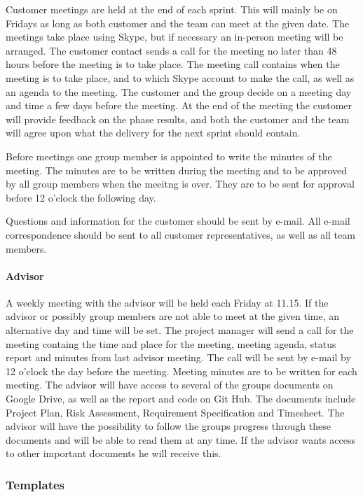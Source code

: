 Customer meetings are held at the end of each sprint. This will mainly be on Fridays as long as both customer and the team can meet at the given date. The meetings take place using Skype, but if necessary an in-person meeting will be arranged. The customer contact sends a call for the meeting no later than 48 hours before the meeting is to take place. The meeting call contains when the meeting is to take place, and to which Skype account to make the call, as well as an agenda to the meeting. The customer and the group decide on a meeting day and time a few days before the meeting. At the end of the meeting the customer will provide feedback on the phase results, and both the customer and the team will agree upon what the delivery for the next sprint should contain.

Before meetings one group member is appointed to write the minutes of the meeting. The minutes are to be written during the meeting and to be approved by all group members when the meeitng is over. They are to be sent for approval before 12 o'clock the following day. 

Questions and information for the customer should be sent by e-mail. All e-mail correspondence should be sent to all customer representatives, as well as all team members.

\paragraph{Advisor}

A weekly meeting with the advisor will be held each Friday at 11.15. If the advisor or possibly group members are not able to meet at the given time, an alternative day and time will be set. The project manager will send a call for the meeting containg the time and place for the meeting, meeting agenda, status report and minutes from last advisor meeting. The call will be sent by e-mail by 12 o'clock the day before the meeting. Meeting minutes are to be written for each meeting. The advisor will have access to several of the groups documents on Google Drive, as well as the report and code on Git Hub. The documents include Project Plan, Risk Assessment, Requirement Specification and Timesheet. The advisor will have the possibility to follow the groups progress through these documents and will be able to read them at any time. If the advisor wants access to other important documents he will receive this. 

\subsubsection{Templates}

